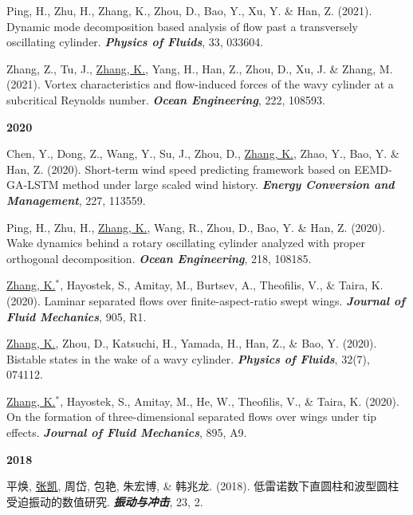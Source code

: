 \documentclass[10pt]{article}
\begin{document}
{\begin{etaremune}
  \item Ping, H., Zhu, H., Zhang, K., Zhou, D., Bao, Y., Xu, Y. \& Han, Z. (2021). Dynamic mode decomposition based analysis of flow past a transversely oscillating cylinder. \textit{\textbf{Physics of Fluids}}, 33, 033604. 
  
  \item Zhang, Z., Tu, J., \underline{Zhang, K.}, Yang, H., Han, Z., Zhou, D., Xu, J. \& Zhang, M. (2021). Vortex characteristics and flow-induced forces of the wavy cylinder at a subcritical Reynolds number. \textit{\textbf{Ocean Engineering}}, 222, 108593.
  
 \item [] {\bf \color{Blue} 2020} 
 
  \item Chen, Y., Dong, Z., Wang, Y., Su, J., Zhou, D., \underline{Zhang, K.}, Zhao, Y., Bao, Y. \& Han, Z. (2020). Short-term wind speed predicting framework based on EEMD-GA-LSTM method under large scaled wind history. \textit{\textbf{Energy Conversion and Management}}, 227, 113559.
  
  \item Ping, H., Zhu, H., \underline{Zhang, K.}, Wang, R., Zhou, D., Bao, Y. \& Han, Z. (2020). Wake dynamics behind a rotary oscillating cylinder analyzed with proper orthogonal decomposition. \textit{\textbf{Ocean Engineering}}, 218, 108185.
  
  \item \underline{Zhang, K.}$^*$, Hayostek, S., Amitay, M., Burtsev, A., Theofilis, V., \& Taira, K. (2020). Laminar separated flows over finite-aspect-ratio swept wings. \textit{\textbf{Journal of Fluid Mechanics}}, 905, R1.
  
  \item \underline{Zhang, K.}, Zhou, D., Katsuchi, H., Yamada, H., Han, Z., \& Bao, Y. (2020). Bistable states in the wake of a wavy cylinder. \textit{\textbf{Physics of Fluids}}, 32(7), 074112.
  
  \item \underline{Zhang, K.}$^*$, Hayostek, S., Amitay, M., He, W., Theofilis, V., \& Taira, K. (2020). On the formation of three-dimensional separated flows over wings under tip effects. \textit{\textbf{Journal of Fluid Mechanics}}, 895, A9.

 \item [] {\bf \color{Blue} 2018} 
  \item 平焕, \underline{张凯}, 周岱, 包艳, 朱宏博, \& 韩兆龙. (2018). 低雷诺数下直圆柱和波型圆柱受迫振动的数值研究. \textit{\textbf{振动与冲击}}, 23, 2.
  

\end{etaremune}}
\end{document}
